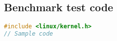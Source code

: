 \documentclass[..thesis.tex]{subfiles}
\begin{document}
\subsection{Benchmark test code}

\label{A:sample-code}
\begin{lstlisting}[language=C,style=def]
#include <linux/kernel.h>
// Sample code
\end{lstlisting}

\newpage
\end{document}
